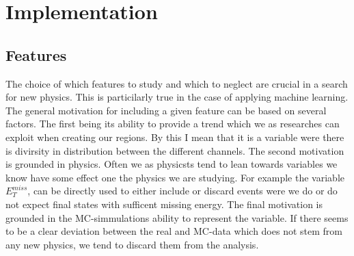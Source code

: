 \chapter{Implementation}\label{chap:Implementation}
\section{Features}
The choice of which features to study and which to neglect are crucial in a search for new physics. This is particilarly true 
in the case of applying machine learning. The general motivation for including a given feature can be based on several factors. 
The first being its ability to provide a trend which we as researches can exploit when creating our regions. By this I mean
that it is a variable were there is divirsity in distribution between the different channels. The second motivation is grounded in 
physics. Often we as physicsts tend to lean towards variables we know have some effect one the physics we are studying. For 
example the variable $E_T^{miss}$, can be directly used to either include or discard events were we do or do not expect final states
with sufficent missing energy. The final motivation is grounded in the \ac{MC}-simmulations ability to represent the variable.
If there seems to be a clear deviation between the real and \ac{MC}-data which does not stem from any new physics, we tend to discard
them from the analysis.

